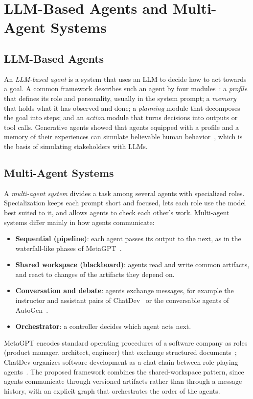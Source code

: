 \section{LLM-Based Agents and Multi-Agent Systems}
\label{sec:bg-mas}

\subsection{LLM-Based Agents}
\label{sec:bg-agents}

An \emph{LLM-based agent} is a system that uses an LLM to decide how to act towards a goal. A common framework describes such an agent by four modules~\cite{wang2024survey}: a \emph{profile} that defines its role and personality, usually in the system prompt; a \emph{memory} that holds what it has observed and done; a \emph{planning} module that decomposes the goal into steps; and an \emph{action} module that turns decisions into outputs or tool calls. Generative agents showed that agents equipped with a profile and a memory of their experiences can simulate believable human behavior~\cite{park2023generative}, which is the basis of simulating stakeholders with LLMs.

\subsection{Multi-Agent Systems}
\label{sec:bg-multi-agent}

A \emph{multi-agent system} divides a task among several agents with specialized roles. Specialization keeps each prompt short and focused, lets each role use the model best suited to it, and allows agents to check each other's work. Multi-agent systems differ mainly in how agents communicate:
\begin{itemize}
    \item \textbf{Sequential (pipeline)}: each agent passes its output to the next, as in the waterfall-like phases of MetaGPT~\cite{hong2024metagpt}.
    \item \textbf{Shared workspace (blackboard)}: agents read and write common artifacts, and react to changes of the artifacts they depend on.
    \item \textbf{Conversation and debate}: agents exchange messages, for example the instructor and assistant pairs of ChatDev~\cite{qian2024chatdev} or the conversable agents of AutoGen~\cite{wu2024autogen}.
    \item \textbf{Orchestrator}: a controller decides which agent acts next.
\end{itemize}
MetaGPT encodes standard operating procedures of a software company as roles (product manager, architect, engineer) that exchange structured documents~\cite{hong2024metagpt}; ChatDev organizes software development as a chat chain between role-playing agents~\cite{qian2024chatdev}. The proposed framework combines the shared-workspace pattern, since agents communicate through versioned artifacts rather than through a message history, with an explicit graph that orchestrates the order of the agents.

